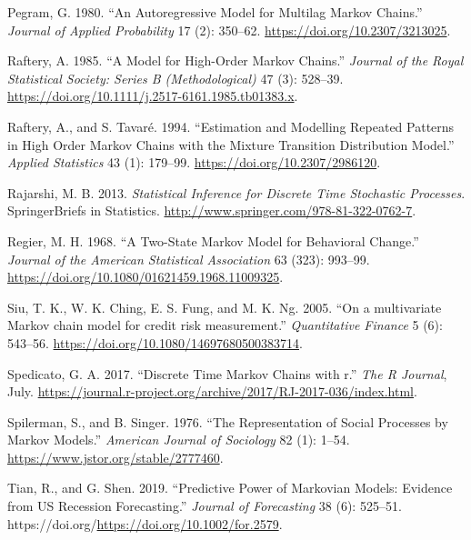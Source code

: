 \begin{CSLReferences}{1}{0}
\leavevmode{}%
Pegram, G. 1980. {``{An Autoregressive Model for Multilag Markov Chains}.''} \emph{Journal of Applied Probability} 17 (2): 350--62. \url{https://doi.org/10.2307/3213025}.

\leavevmode{}%
Raftery, A. 1985. {``{A Model for High-Order Markov Chains}.''} \emph{Journal of the Royal Statistical Society: Series B (Methodological)} 47 (3): 528--39. \url{https://doi.org/10.1111/j.2517-6161.1985.tb01383.x}.

\leavevmode{}%
Raftery, A., and S. Tavaré. 1994. {``{Estimation and Modelling Repeated Patterns in High Order Markov Chains with the Mixture Transition Distribution Model}.''} \emph{Applied Statistics} 43 (1): 179--99. \url{https://doi.org/10.2307/2986120}.

\leavevmode{}%
Rajarshi, M. B. 2013. \emph{Statistical Inference for Discrete Time Stochastic Processes}. {SpringerBriefs in Statistics}. \url{http://www.springer.com/978-81-322-0762-7}.

\leavevmode{}%
Regier, M. H. 1968. {``{A Two-State Markov Model for Behavioral Change}.''} \emph{Journal of the American Statistical Association} 63 (323): 993--99. \url{https://doi.org/10.1080/01621459.1968.11009325}.

\leavevmode{}%
Siu, T. K., W. K. Ching, E. S. Fung, and M. K. Ng. 2005. {``{On a multivariate Markov chain model for credit risk measurement}.''} \emph{Quantitative Finance} 5 (6): 543--56. \url{https://doi.org/10.1080/14697680500383714}.

\leavevmode{}%
Spedicato, G. A. 2017. {``Discrete Time Markov Chains with r.''} \emph{The R Journal}, July. \url{https://journal.r-project.org/archive/2017/RJ-2017-036/index.html}.

\leavevmode{}%
Spilerman, S., and B. Singer. 1976. {``{The Representation of Social Processes by Markov Models}.''} \emph{American Journal of Sociology} 82 (1): 1--54. \url{https://www.jstor.org/stable/2777460}.

\leavevmode{}%
Tian, R., and G. Shen. 2019. {``Predictive Power of Markovian Models: Evidence from US Recession Forecasting.''} \emph{Journal of Forecasting} 38 (6): 525--51. https://doi.org/\url{https://doi.org/10.1002/for.2579}.


\end{CSLReferences}
